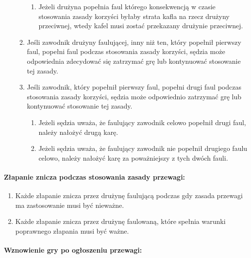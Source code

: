 \documentclass[12pt]{article}
\begin{document}
\begin{enumerate}
\begin{enumerate}
    \begin{enumerate}
    \item
            Jeżeli drużyna popełnia faul którego konsekwencją w czasie
      stosowania zasady korzyści byłaby strata kafla na rzecz drużyny
      przeciwnej, wtedy kafel musi zostać przekazany drużynie
      przeciwnej.
          \end{enumerate}
  \item
        Jeśli zawodnik drużyny faulującej, inny niż ten, który popełnił
    pierwszy faul, popełni faul podczas stosowania zasady korzyści,
    sędzia może odpowiednia zdecydować się zatrzymać grę lub kontynuować
    stosowanie tej zasady.
      \item
        Jeśli zawodnik, który popełnił pierwszy faul, popełni drugi faul
    podczas stosowania zasady korzyści, sędzia może odpowiednio
    zatrzymać grę lub kontynuować stosowanie tej zasady.
    
    \begin{enumerate}
    \item
            Jeżeli sędzia uważa, że faulujący zawodnik celowo popełnił drugi
      faul, należy nałożyć drugą karę.
          \item
            Jeżeli sędzia uważa, że faulujący zawodnik nie popełnił drugiego
      faulu celowo, należy nałożyć karę za poważniejszy z tych dwóch
      fauli.
          \end{enumerate}
  \end{enumerate}
\end{enumerate}

\paragraph{Złapanie znicza podczas stosowania zasady przewagi:}

\begin{enumerate}
\item
    Każde złapanie znicza przez drużynę faulującą podczas gdy zasada
  przewagi ma zastosowanie musi być nieważne.
  \item
    Każde złapanie znicza przez drużynę faulowaną, które spełnia warunki
  poprawnego złapania musi być ważne.
  \end{enumerate}

\paragraph{Wznowienie gry po ogłoszeniu przewagi:}
\end{document}

